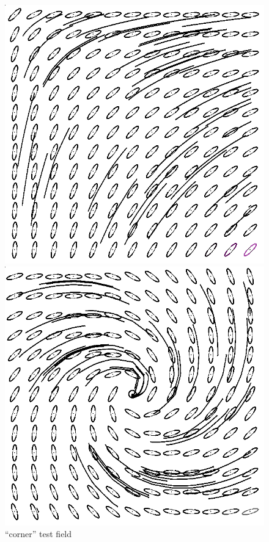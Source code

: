 \documentclass{scrartcl}
\begin{document}
\begin{figure}[!t]
\centering
  \begin{minipage}{0.3\textwidth}
    \includegraphics[height=\textwidth]{img/corner-TFL.png}
    \caption{``corner'' test field}
    \label{a)}
  \end{minipage}
  \begin{minipage}{0.3\textwidth}
    \includegraphics[height=\textwidth]{img/spiral-TFL.png}

\end{minipage}
\end{figure}
\end{document}
